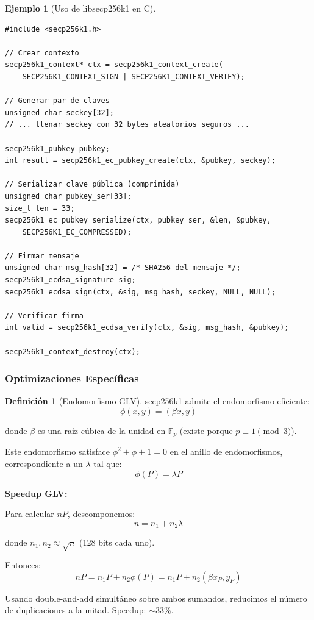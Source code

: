 \documentclass[11pt,a4paper,twoside,openright]{book}
\theoremstyle{definition}
\newtheorem{definition}{Definición}[chapter]
\newtheorem{example}{Ejemplo}[chapter]
\theoremstyle{plain}
\theoremstyle{remark}
\newcommand{\Fp}{\mathbb{F}_p}
\begin{document}
\begin{example}[Uso de libsecp256k1 en C]
\begin{verbatim}
#include <secp256k1.h>

// Crear contexto
secp256k1_context* ctx = secp256k1_context_create(
    SECP256K1_CONTEXT_SIGN | SECP256K1_CONTEXT_VERIFY);

// Generar par de claves
unsigned char seckey[32];
// ... llenar seckey con 32 bytes aleatorios seguros ...

secp256k1_pubkey pubkey;
int result = secp256k1_ec_pubkey_create(ctx, &pubkey, seckey);

// Serializar clave pública (comprimida)
unsigned char pubkey_ser[33];
size_t len = 33;
secp256k1_ec_pubkey_serialize(ctx, pubkey_ser, &len, &pubkey,
    SECP256K1_EC_COMPRESSED);

// Firmar mensaje
unsigned char msg_hash[32] = /* SHA256 del mensaje */;
secp256k1_ecdsa_signature sig;
secp256k1_ecdsa_sign(ctx, &sig, msg_hash, seckey, NULL, NULL);

// Verificar firma
int valid = secp256k1_ecdsa_verify(ctx, &sig, msg_hash, &pubkey);

secp256k1_context_destroy(ctx);
\end{verbatim}
\end{example}

\subsubsection{Optimizaciones Específicas}

\begin{definition}[Endomorfismo GLV]
secp256k1 admite el endomorfismo eficiente:
\[ \phi(x, y) = (\beta x, y) \]

donde $\beta$ es una raíz cúbica de la unidad en $\Fp$ (existe porque $p \equiv 1 \pmod{3}$).

Este endomorfismo satisface $\phi^2 + \phi + 1 = 0$ en el anillo de endomorfismos, correspondiente a un $\lambda$ tal que:
\[ \phi(P) = \lambda P \]
\end{definition}

\begin{keyidea}
\textbf{Speedup GLV:}

Para calcular $nP$, descomponemos:
\[ n = n_1 + n_2 \lambda \]

donde $n_1, n_2 \approx \sqrt{n}$ (128 bits cada uno).

Entonces:
\[ nP = n_1 P + n_2 \phi(P) = n_1 P + n_2 (\beta x_P, y_P) \]

Usando double-and-add simultáneo sobre ambos sumandos, reducimos el número de duplicaciones a la mitad. Speedup: $\sim$33\%.
\end{keyidea}
\end{document}
